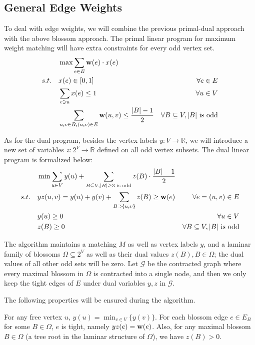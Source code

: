 \subsection{General Edge Weights}

To deal with edge weights, we will combine the previous primal-dual approach with the above blossom approach. The primal linear program for maximum weight matching will have extra constraints for every odd vertex set.
$$\begin{aligned}
	&\max \sum_{e\in E}\mathbf{w}(e)\cdot x(e)\\
	s.t.\quad & x(e)\in [0, 1]	&	\forall e\in E\\
	& \sum_{e\ni u}x(e) \leq 1	&	\forall u\in V\\
	& \sum_{u, v\in B, (u, v)\in E}\mathbf{w}(u, v)\leq\frac{|B|-1}{2} & \forall B\subseteq V, |B|\text{ is odd}
\end{aligned}$$


As for the dual program, besides the vertex labels $y: V\rightarrow \mathbb{R}$, we will introduce a new set of variables $z: 2^V\rightarrow \mathbb{R}$ defined on all odd vertex subsets. The dual linear program is formalized below:
$$\begin{aligned}
	&\min \sum_{u\in V}y(u) + \sum_{B\subseteq V, |B|\geq 3 \text{ is odd}}z(B)\cdot \frac{|B|-1}{2}\\
	s.t.\quad &	yz(u, v) = y(u) + y(v) + \sum_{B\supset\{u, v\}}z(B)\geq \mathbf{w}(e)	&\forall e = (u, v)\in E\\
	&	y(u)\geq 0	&\forall u\in V\\
	&  z(B)\geq 0 &\forall B\subseteq V, |B|\text{ is odd}
\end{aligned}$$

The algorithm maintains a matching $M$ as well as vertex labels $y$, and a laminar family of blossoms $\Omega\subseteq 2^V$ as well as their dual values $z(B), B\in \Omega$; the dual values of all other odd sets will be zero. Let $\mathcal{G}$ be the contracted graph where every maximal blossom in $\Omega$ is contracted into a single node, and then we only keep the tight edges of $E$ under dual variables $y, z$ in $\mathcal{G}$.

The following properties will be ensured during the algorithm.
\begin{invariant}\label{blossom-inv}
	For any free vertex $u$, $y(u) = \min_{v\in V}\{y(v)\}$.
	For each blossom edge $e\in E_B$ for some $B\in \Omega$, $e$ is tight, namely $yz(e) = \mathbf{w}(e)$. Also, for any maximal blossom $B\in \Omega$ (a tree root in the laminar structure of $\Omega$), we have $z(B) > 0$.
\end{invariant}

